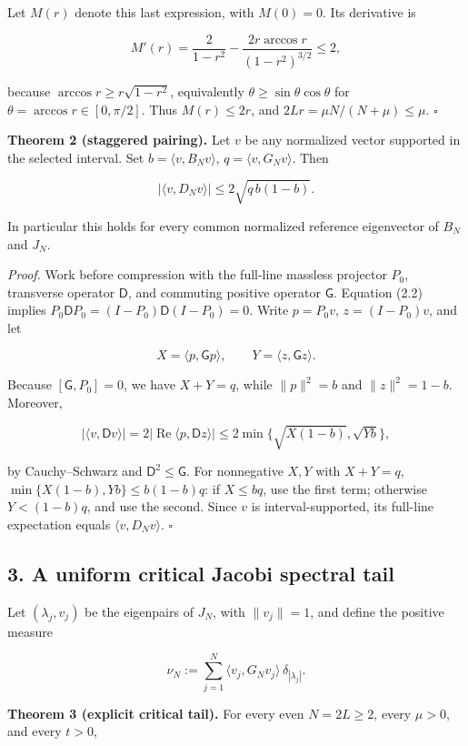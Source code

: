 \documentclass[
  10pt,
  a4paper,
]{article}
\begin{document}
Let \(M(r)\) denote this last expression, with \(M(0)=0\). Its derivative is

\[
 M'(r)=\frac2{1-r^2}-\frac{2r\arccos r}{(1-r^2)^{3/2}}\le2,
\]

because \(\arccos r\ge r\sqrt{1-r^2}\), equivalently \(\theta\ge\sin\theta\cos\theta\) for \(\theta=\arccos r\in[0,\pi/2]\). Thus \(M(r)\le2r\), and \(2Lr=\mu N/(N+\mu)\le\mu\). \(\square\)

\textbf{Theorem 2 (staggered pairing).} Let \(v\) be any normalized vector supported in the selected interval. Set \(b=\langle v,B_Nv\rangle\), \(q=\langle v,G_Nv\rangle\). Then

\[
 \boxed{|\langle v,D_Nv\rangle|\le2\sqrt{q\,b(1-b)}.}
 \tag{2.5}
\]

In particular this holds for every common normalized reference eigenvector of \(B_N\) and \(J_N\).

\emph{Proof.} Work before compression with the full-line massless projector \(P_0\), transverse operator \(\mathsf D\), and commuting positive operator \(\mathsf G\). Equation (2.2) implies \(P_0\mathsf DP_0=(I-P_0)\mathsf D(I-P_0)=0\). Write \(p=P_0v\), \(z=(I-P_0)v\), and let

\[
 X=\langle p,\mathsf Gp\rangle,\qquad
 Y=\langle z,\mathsf Gz\rangle.
\]

Because \([\mathsf G,P_0]=0\), we have \(X+Y=q\), while \(\|p\|^2=b\) and \(\|z\|^2=1-b\). Moreover,

\[
 |\langle v,\mathsf Dv\rangle|
 =2|\operatorname{Re}\langle p,\mathsf Dz\rangle|
 \le2\min\{\sqrt{X(1-b)},\sqrt{Yb}\},
\]

by Cauchy--Schwarz and \(\mathsf D^2\le\mathsf G\). For nonnegative \(X,Y\) with \(X+Y=q\), \(\min\{X(1-b),Yb\}\le b(1-b)q\): if \(X\le bq\), use the first term; otherwise \(Y<(1-b)q\), and use the second. Since \(v\) is interval-supported, its full-line expectation equals \(\langle v,D_Nv\rangle\). \(\square\)

\subsection{3. A uniform critical Jacobi spectral tail}\label{a-uniform-critical-jacobi-spectral-tail}

Let \((\lambda_j,v_j)\) be the eigenpairs of \(J_N\), with \(\|v_j\|=1\), and define the positive measure

\[
 \nu_N:=\sum_{j=1}^{N}\langle v_j,G_Nv_j\rangle\,\delta_{|\lambda_j|}.
\]

\textbf{Theorem 3 (explicit critical tail).} For every even \(N=2L\ge2\), every \(\mu>0\), and every \(t>0\),
\end{document}
